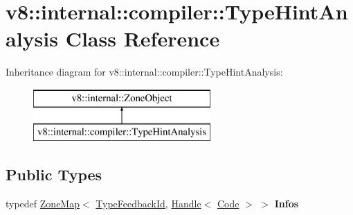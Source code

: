\hypertarget{classv8_1_1internal_1_1compiler_1_1_type_hint_analysis}{}\section{v8\+:\+:internal\+:\+:compiler\+:\+:Type\+Hint\+Analysis Class Reference}
\label{classv8_1_1internal_1_1compiler_1_1_type_hint_analysis}
Inheritance diagram for v8\+:\+:internal\+:\+:compiler\+:\+:Type\+Hint\+Analysis\+:\begin{figure}[H]
\begin{center}
\leavevmode
\includegraphics[height=2.000000cm]{classv8_1_1internal_1_1compiler_1_1_type_hint_analysis}
\end{center}
\end{figure}
\subsection*{Public Types}
\begin{DoxyCompactItemize}
\item 
typedef \hyperlink{classv8_1_1internal_1_1_zone_map}{Zone\+Map}$<$ \hyperlink{classv8_1_1internal_1_1_type_feedback_id}{Type\+Feedback\+Id}, \hyperlink{classv8_1_1internal_1_1_handle}{Handle}$<$ \hyperlink{classv8_1_1internal_1_1_code}{Code} $>$ $>$ {\bfseries Infos}\hypertarget{classv8_1_1internal_1_1compiler_1_1_type_hint_analysis_a4a3f4d04663c14400d5299e9ae6d9afc}{}\label{classv8_1_1internal_1_1compiler_1_1_type_hint_analysis_a4a3f4d04663c14400d5299e9ae6d9afc}

\end{DoxyCompactItemize}
